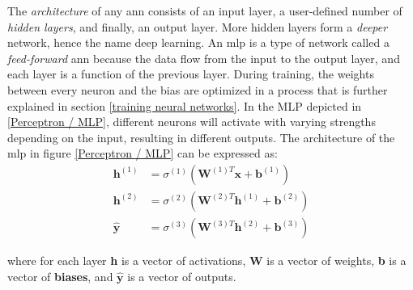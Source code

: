         The \textit{architecture} of any \gls{ann} consists of an input layer, a user-defined number of \textit{hidden layers}, and finally, an output layer\cite{razavi2021deep_exp_per}. More hidden layers form a \textit{deeper} network, hence the name deep learning. An \gls{mlp} is a type of network called a \textit{feed-forward} \gls{ann} because the data flow from the input to the output layer, and each layer is a function of the previous layer. During training, the weights between every neuron and the bias are optimized in a process that is  further explained in section \ref{training neural networks}. In the MLP depicted in \ref{Perceptron / MLP}, different neurons will activate with varying strengths depending on the input, resulting in different outputs. The architecture of the \gls{mlp} in figure \ref{Perceptron / MLP} can be expressed as\cite{Goodfellow-et-al-2016}:
        \begin{align}\label{mlp outputlayer eq}
            \textbf{h}^{(1)} &= \sigma^{(1)}(\textbf{W}^{(1)T}\textbf{x} + \textbf{b}^{(1)})\\
            \textbf{h}^{(2)} &= \sigma^{(2)}(\textbf{W}^{(2)T}\textbf{h}^{(1)} + \textbf{b}^{(2)})\\
            \hat{\textbf{y}} &= \sigma^{(3)}(\textbf{W}^{(3)T}\textbf{h}^{(2)} + \textbf{b}^{(3)})
        \end{align}

        
        
        
        where for each layer \textbf{h} is a vector of activations, \textbf{W} is a vector of weights, \textbf{b} is a  vector of \textbf{biases}, and $\hat{\textbf{y}}$ is a vector of outputs. %
        
